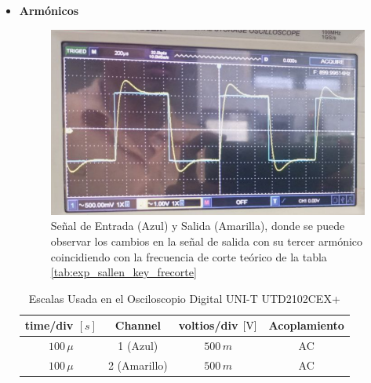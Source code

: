              \begin{itemize}
                \item \textbf{Armónicos}

                     \begin{figure}[H]
                        \centering
                        \renewcommand{\figurename}{Imagen}
                        \setcounter{figure}{14}
                        \includegraphics[width=15cm]{Imagenes/armonico_sallen_key.png}
                        \caption{Señal de Entrada (Azul) y Salida (Amarilla), donde se puede observar los cambios en la señal de salida con su tercer armónico coincidiendo con la frecuencia de corte teórico de la tabla \ref{tab:exp_sallen_key_frecorte}}
                        \label{fig:armonico_sallen_key}
                    \end{figure}
            
                    \begin{table}[H]
                        \centering
                        \begin{tabular}{|c|c|c|c|}
                            \hline
                            \textbf{time/div} $[s]$ & \textbf{Channel} & \textbf{voltios/div $[\volt]$} & \textbf{Acoplamiento} \\ \hline
                            $100 \, \mu$ & 1 (Azul) &  $500 \, m $ & AC \\ \hline
                            $100 \, \mu$ & 2 (Amarillo)  &   $500 \, m $ & AC \\ \hline  
                        \end{tabular}
                        \caption{Escalas Usada en el Osciloscopio Digital UNI-T UTD2102CEX+}
                        \label{tab:escala_exp_sallen_key_armonico}
                    \end{table}
            \end{itemize}

